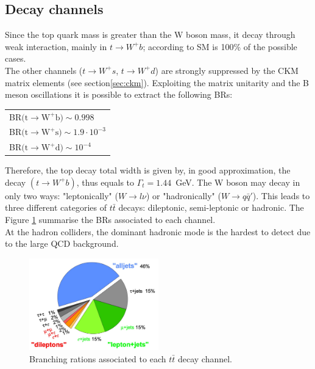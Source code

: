 \subsection{Decay channels}
Since the top quark mass is greater than the W boson mass, it decay through weak interaction, mainly in $t\rightarrow W^{+}b$; according to SM is 100\% of the possible cases.\\
The other channels ($t\rightarrow W^{+}s$, $t\rightarrow W^{+}d$) are strongly suppressed by the CKM matrix elements (see section\ref{sec:ckm}). Exploiting the matrix unitarity 
and the B meson oscillations it is possible to extract the following BRs\cite{tdecayBR}:
\begin{table}[!ht]
	\centering
	\begin{tabular}{l}
		BR$(\mathrm{t \rightarrow W^{+} b)\sim 0.998}$\\
		BR$(\mathrm{t \rightarrow W^{+} s)\sim 1.9\cdot10^{-3}}$\\
		BR$(\mathrm{t \rightarrow W^{+} d)\sim 10^{-4}}$\\
	\end{tabular}
\end{table}
\newline Therefore, the top decay total width is given by, in good approximation, the decay $(t \rightarrow W^{+} b)$, thus equals to $\Gamma_t = 1.44$~GeV.
The W boson may decay in only two ways: "leptonically" ($W\rightarrow l\nu$) or "hadronically" ($W\rightarrow q\bar{q}'$). This leads to three different categories
of $t\bar{t}$ decays: dileptonic, semi-leptonic or hadronic. The Figure \ref{fig:ttBR} summarise the BRs associated to each channel.\\
At the hadron colliders, the dominant hadronic mode is the hardest to detect due to the large QCD background.
\begin{figure}[!h]
	\centering
	\includegraphics[width=0.5\textwidth]{Chapters/CH1/figures/ttBR}
	\caption{Branching rations associated to each $t\bar{t}$ decay channel\cite{ttdecayBR}.}
	\label{fig:ttBR}
\end{figure}

